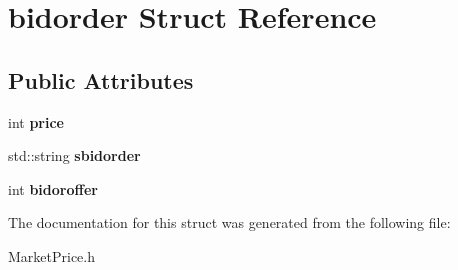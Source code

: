 \hypertarget{structbidorder}{}\section{bidorder Struct Reference}
\label{structbidorder}
\subsection*{Public Attributes}
\begin{DoxyCompactItemize}
\item 
int {\bfseries price}\hypertarget{structbidorder_af8e2413b1a2f24c610b0c1d93b665b1e}{}\label{structbidorder_af8e2413b1a2f24c610b0c1d93b665b1e}

\item 
std\+::string {\bfseries sbidorder}\hypertarget{structbidorder_a6cdee520c86e381fce20beccb016d1e1}{}\label{structbidorder_a6cdee520c86e381fce20beccb016d1e1}

\item 
int {\bfseries bidoroffer}\hypertarget{structbidorder_a4452f446cdcf846431677c9e0e378515}{}\label{structbidorder_a4452f446cdcf846431677c9e0e378515}

\end{DoxyCompactItemize}


The documentation for this struct was generated from the following file\+:\begin{DoxyCompactItemize}
\item 
Market\+Price.\+h\end{DoxyCompactItemize}
